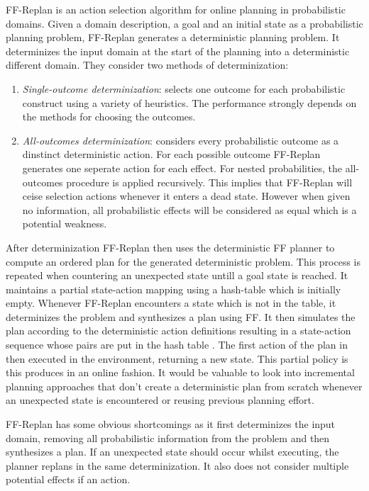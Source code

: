 \documentclass[runningheads,a4paper]{llncs}
\begin{document}
FF-Replan is an action selection algorithm for online planning in probabilistic domains. Given a domain description, a goal and an initial state as a probabilistic planning problem, FF-Replan generates a deterministic planning problem. It determinizes the input domain at the start of the planning into a deterministic different domain. They consider two methods of determinization:
\begin{enumerate}
	\item \emph{Single-outcome determinization}: selects one outcome for each probabilistic construct using a variety of heuristics. The performance strongly depends on the methods for choosing the outcomes.
	\item \emph{All-outcomes determinization}: considers every probabilistic outcome as a dinstinct deterministic action. For each possible outcome  FF-Replan generates one seperate action for each effect. For nested probabilities, the all-outcomes procedure is applied recursively. This implies that FF-Replan will ceise selection actions whenever it enters a dead state. However when given no information, all probabilistic effects will be considered as equal which is a potential weakness. 
\end{enumerate}

After determinization FF-Replan then uses the deterministic FF planner to compute an ordered plan for the generated deterministic problem. This process is repeated when countering an unexpected state untill a goal state is reached. It maintains a partial state-action mapping using a hash-table which is initially empty. Whenever FF-Replan encounters a state which is not in the table, it determinizes the problem and synthesizes a plan using FF. It then simulates the plan according to the deterministic action definitions resulting in a state-action sequence whose pairs are put in the hash table . The first action of the plan in then executed in the environment, returning a new state. This partial policy is this produces in an online fashion. It would be valuable to look into incremental planning approaches that don't create a deterministic plan from scratch whenever an unexpected state is encountered or reusing previous planning effort. 

FF-Replan has some obvious shortcomings as it first determinizes the input domain, removing all probabilistic information from the problem and then synthesizes a plan. If an unexpected state should occur whilst executing, the planner replans in the same determinization. It also does not consider multiple potential effects if an action. 
\end{document}
